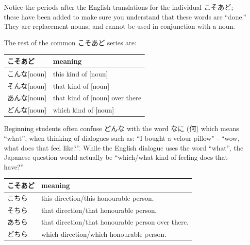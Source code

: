 \documentclass[11pt, b5paper, twoside, openright, onecolumn]{book}
\makeatletter
\newcommand*{\rubystack}[2]{{\relscale{0.5}%
  \begin{tabular}[b]{@{}c@{}}%
    {#1}\\%
   {\textscale{2}{#2}}%
  \end{tabular}}%
}
\DeclareRobustCommand*{\ruby}[2]{%
  \mbox{%
    \setlength{\parskip}{0ex}%
    \BeginAccSupp{method=pdfstringdef,ActualText={#1}}%
      \rubystack{\phantom{#2}}{#1}%
      \llap{%
        \rubystack{#2}{\phantom{#1}}%
      }%
    \EndAccSupp{}%
  }%
}
\renewcommand*{\ruby}[2]{#2 (#1)}%
\newenvironment{mytabularcentered}[1]{\noindent
\begin{center}\begin{tabular}[h]{#1}}{\end{tabular}\end{center}}
\makeatother
\begin{document}
Notice the periods after the English translations for the individual こそあど; these have been added to make sure you understand that these words are “done.” They are replacement nouns‚ and cannot be used in conjunction with a noun.


The rest of the common こそあど series are:

\vspace{0.5cm}
\smaller
\begin{center}
\begin{mytabularcentered}{| l  l |}\hline 
\rule{0pt}{2.4ex}こそあど & meaning\\ 
\hline
\rule{0pt}{2.4ex}\index[japanese]{こんな}こんな[noun] & \index[english]{This!kind of}this kind of [noun]\\ 
\rule{0pt}{2.4ex}\index[japanese]{そんな}そんな[noun] & \index[english]{That!kind of}that kind of [noun]\\ 
\rule{0pt}{2.4ex}\index[japanese]{あんな}あんな[noun] & that kind of [noun] over there\\ 
\rule{0pt}{2.4ex}\index[japanese]{どんな}どんな[noun] & \index[english]{Which!kind of}which kind of [noun]\\ 
\hline 
\end{mytabularcentered}
\end{center}
\larger
\vspace{0.5cm}


Beginning students often confuse どんな with the word \ruby{何}{なに} which means “what”‚ when thinking of dialogues such as: “I bought a velour pillow” - “wow‚ what does that feel like?”. While the English dialogue uses the word “what”‚ the Japanese question would actually be “which/what kind of feeling does that have?”

\vspace{0.5cm}
\smaller
\begin{center}
\begin{mytabularcentered}{| l  l |}\hline 
\rule{0pt}{2.4ex}こそあど & meaning\\ 
\hline
\rule{0pt}{2.4ex}\index[japanese]{こちら}こちら & \index[english]{This!direction}this direction/\index[english]{This!honourable person}this honourable person.\\ 
\rule{0pt}{2.4ex}\index[japanese]{そちら}そちら & \index[english]{That!direction}that direction/\index[english]{That!honourable person}that honourable person.\\ 
\rule{0pt}{2.4ex}\index[japanese]{あちら}あちら & that direction/that honourable person over there.\\ 
\rule{0pt}{2.4ex}\index[japanese]{どちら}どちら & \index[english]{Which!direction}which direction/\index[english]{Which!honourable person}which honourable person.\\ 
\hline 
\end{mytabularcentered}
\end{center}
\larger
\vspace{0.5cm}
\end{document}
